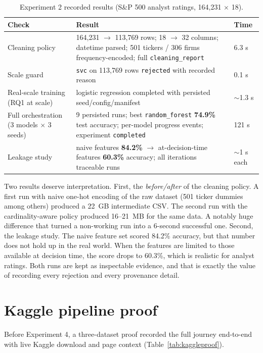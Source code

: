 \begin{table}[H]
\centering
\caption{Experiment 2 recorded results (S\&P 500 analyst ratings, 164{,}231 $\times$ 18).}
\label{tab:spresults}
\small
\begin{tabular}{p{4.4cm}p{7.6cm}p{2.4cm}}
\toprule
\textbf{Check} & \textbf{Result} & \textbf{Time} \\
\midrule
Cleaning policy & 164{,}231 $\rightarrow$ 113{,}769 rows; 18 $\rightarrow$ 32 columns; datetime parsed; 501 tickers / 306 firms frequency-encoded; full \texttt{cleaning\_report} & 6.3 s \\
Scale guard & \texttt{svc} on 113{,}769 rows \texttt{rejected} with recorded reason & 0.1 s \\
Real-scale training (RQ1 at scale) & logistic regression completed with persisted seed/config/manifest & $\sim$1.3 s \\
Full orchestration (3 models $\times$ 3 seeds) & 9 persisted runs; best \texttt{random\_forest} \textbf{74.9\%} test accuracy; per-model progress events; experiment \texttt{completed} & 121 s \\
Leakage study & naive features \textbf{84.2\%} $\rightarrow$ at-decision-time features \textbf{60.3\%} accuracy; all iterations traceable runs & $\sim$1 s each \\
\bottomrule
\end{tabular}
\end{table}

Two results deserve interpretation. First, the \emph{before/after} of the cleaning policy. A first run with naive one-hot encoding of the raw dataset (501 ticker dummies among others) produced a 22~GB intermediate CSV. The second run with the cardinality-aware policy produced 16--21~MB for the same data. A notably huge difference that turned a non-working run into a 6-second successful one. Second, the leakage study. The naive feature set scored 84.2\% accuracy, but that number does not hold up in the real world. When the features are limited to those available at decision time, the score drops to 60.3\%, which is realistic for analyst ratings. Both runs are kept as inspectable evidence, and that is exactly the value of recording every rejection and every provenance detail.

\section{Kaggle pipeline proof}
\label{sec:kaggle-results}

Before Experiment 4, a three-dataset proof recorded the full journey end-to-end with live Kaggle download and page context (Table~\ref{tab:kaggleproof}).

